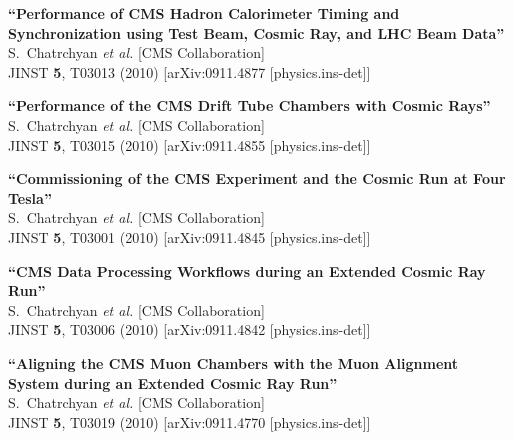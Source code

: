 \documentclass[10pt, a4paper]{article}
\begin{document}
\begin{thebibliography}{599}
{\bf ``Performance of CMS Hadron Calorimeter Timing and Synchronization using Test Beam, Cosmic Ray, and LHC Beam Data''}
  \\{}S.~Chatrchyan {\it et al.}  [CMS Collaboration]
  \\{}JINST {\bf 5}, T03013 (2010)
  [arXiv:0911.4877 [physics.ins-det]]

{\bf ``Performance of the CMS Drift Tube Chambers with Cosmic Rays''}
  \\{}S.~Chatrchyan {\it et al.}  [CMS Collaboration]
  \\{}JINST {\bf 5}, T03015 (2010)
  [arXiv:0911.4855 [physics.ins-det]]

{\bf ``Commissioning of the CMS Experiment and the Cosmic Run at Four Tesla''}
  \\{}S.~Chatrchyan {\it et al.}  [CMS Collaboration]
  \\{}JINST {\bf 5}, T03001 (2010)
  [arXiv:0911.4845 [physics.ins-det]]

{\bf ``CMS Data Processing Workflows during an Extended Cosmic Ray Run''}
  \\{}S.~Chatrchyan {\it et al.}  [CMS Collaboration]
  \\{}JINST {\bf 5}, T03006 (2010)
  [arXiv:0911.4842 [physics.ins-det]]

{\bf ``Aligning the CMS Muon Chambers with the Muon Alignment System during an Extended Cosmic Ray Run''}
  \\{}S.~Chatrchyan {\it et al.}  [CMS Collaboration]
  \\{}JINST {\bf 5}, T03019 (2010)
  [arXiv:0911.4770 [physics.ins-det]]


\end{thebibliography}
\end{document}
